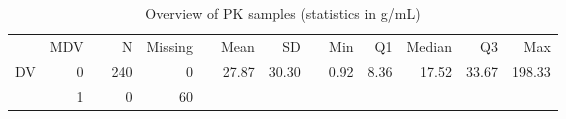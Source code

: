 \begin{table}[ht]
\centering
\caption{Overview of PK samples (statistics in \textmu g/mL)} 
\label{tab:SumPKsamples}
\begingroup\footnotesize
\begin{tabular}{lrrrrrrrrrrrrr}
  \toprule
   & MDV &   & N & Missing &   & Mean & SD &   & Min & Q1 & Median & Q3 & Max \\ 
    \cmidrule{4-5}  \cmidrule{7-8} \cmidrule{10-14}
 DV & 0 &  & 240 &   0 &  & 27.87 & 30.30 &  & 0.92 & 8.36 & 17.52 & 33.67 & 198.33 \\ 
   & 1 &  &   0 &  60 &  &  &  &  &  &  &  &  &  \\ 
   \bottomrule
\end{tabular}
\endgroup
\end{table}

